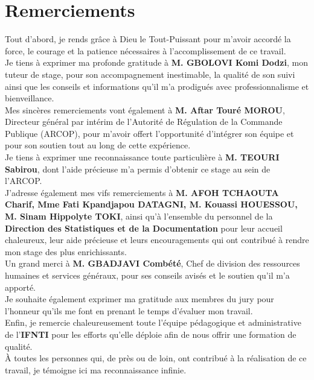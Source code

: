 \chapter*{Remerciements}
\thispagestyle{empty}


Tout d’abord, je rends grâce à Dieu le Tout-Puissant pour m’avoir accordé la force, le courage et la patience nécessaires à l’accomplissement de ce travail.\\

Je tiens à exprimer ma profonde gratitude à \textbf{M. GBOLOVI Komi Dodzi}, mon tuteur de stage, pour son accompagnement inestimable, la qualité de son suivi ainsi que les conseils et informations qu’il m’a prodigués avec professionnalisme et bienveillance.\\

Mes sincères remerciements vont également à \textbf{M. Aftar Touré MOROU}, Directeur général par intérim de l’Autorité de Régulation de la Commande Publique (\ac{ARCOP}), pour m’avoir offert l’opportunité d’intégrer son équipe et pour son soutien tout au long de cette expérience.\\

Je tiens à exprimer une reconnaissance toute particulière à \textbf{M. TEOURI Sabirou}, dont l’aide précieuse m’a permis d’obtenir ce stage au sein de l’\ac{ARCOP}.\\

J’adresse également mes vifs remerciements à \textbf{M. AFOH TCHAOUTA Charif, Mme Fati Kpandjapou DATAGNI, M. Kouassi HOUESSOU, M. Sinam Hippolyte TOKI}, ainsi qu’à l’ensemble du personnel de la \textbf{Direction des Statistiques et de la Documentation} pour leur accueil chaleureux, leur aide précieuse et leurs encouragements qui ont contribué à rendre mon stage des plus enrichissants.\\

Un grand merci à \textbf{M. GBADJAVI Combété}, Chef de division des ressources humaines et services généraux, pour ses conseils avisés et le soutien qu’il m’a apporté.\\

Je souhaite également exprimer ma gratitude aux membres du jury pour l’honneur qu’ils me font en prenant le temps d’évaluer mon travail.\\

Enfin, je remercie chaleureusement toute l’équipe pédagogique et administrative de l’\textbf{\ac{IFNTI}} pour les efforts qu’elle déploie afin de nous offrir une formation de qualité.\\

À toutes les personnes qui, de près ou de loin, ont contribué à la réalisation de ce travail, je témoigne ici ma reconnaissance infinie.


\clearpage